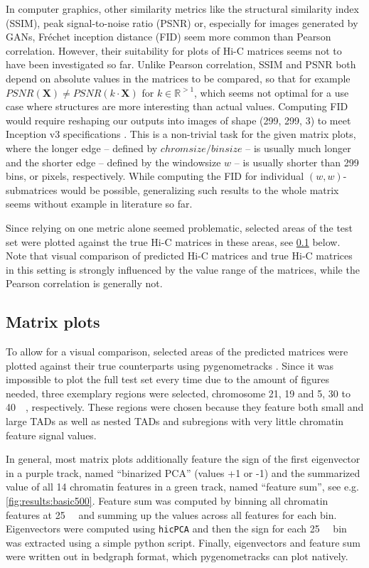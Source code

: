 In computer graphics, other similarity metrics like the structural similarity index (SSIM), peak signal-to-noise ratio (PSNR) or, especially for images generated by GANs, 
Fréchet inception distance (FID) seem more common than Pearson correlation.
However, their suitability for plots of Hi-C matrices seems not to have been investigated so far. 
Unlike Pearson correlation, SSIM and PSNR both depend on absolute values in the matrices to be compared, 
so that for example $\mathit{PSNR}(\mathbf{X}) \not=\mathit{PSNR}(k\cdot \mathbf{X})$ for $k\in\mathbb{R}^{>1}$, which seems not optimal for a use case
where structures are more interesting than actual values.
Computing FID would require reshaping our outputs into images of shape (299, 299, 3) to meet Inception v3 specifications \cite{Szegedy2016}.
This is a non-trivial task for the given matrix plots,
where the longer edge -- defined by $\mathit{chromsize}/\mathit{binsize}$ -- is usually much longer 
and the shorter edge -- defined by the windowsize $w$ -- is usually shorter than 299 bins, or pixels, respectively.
While computing the FID for individual $(w,w)$-submatrices would be possible,
generalizing such results to the whole matrix seems without example in literature so far.

Since relying on one metric alone seemed problematic, selected areas of the test set were plotted against the true 
Hi-C matrices in these areas, see \cref{sec:methods:matrix_plots} below.
Note that visual comparison of predicted Hi-C matrices and true Hi-C matrices in this setting is strongly influenced by
the value range of the matrices, while the Pearson correlation is generally not.

\subsection{Matrix plots} \label{sec:methods:matrix_plots}
To allow for a visual comparison, selected areas of the predicted matrices were plotted against their true counterparts using pygenometracks \cite{LopezDelisle2020}.
Since it was impossible to plot the full test set every time due to the amount of figures needed, 
three exemplary regions were selected, chromosome 21, 19 and 5, 30 to \SI{40}{\mega\bp}, respectively. 
These regions were chosen because they feature both small and large TADs as well as nested TADs and subregions with very little chromatin feature signal values.

In general, most matrix plots additionally feature the sign of the first eigenvector in a purple track, named ``binarized PCA'' (values +1 or -1)
and the summarized value of all 14 chromatin features in a green track, named ``feature sum'', see e.g. \cref{fig:results:basic500}.
Feature sum was computed by binning all chromatin features at \SI{25}{\kilo\bp} and 
summing up the values across all features for each bin.
Eigenvectors were computed using \texttt{hicPCA} \cite{Wolff2018} and then the sign for each \SI{25}{\kilo\bp} bin was extracted using 
a simple python script. Finally, eigenvectors and feature sum were written out in bedgraph format, which pygenometracks can plot natively.

